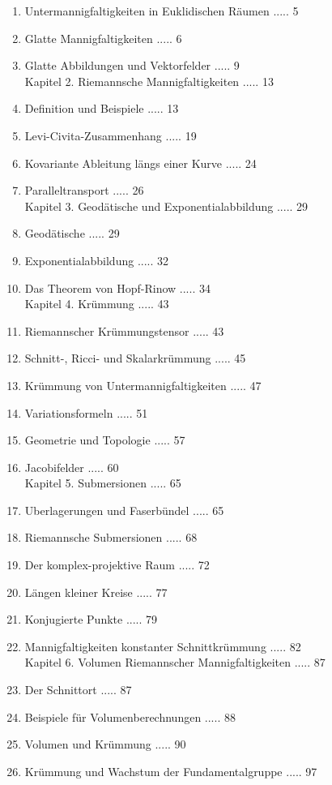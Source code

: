 \documentclass[10pt]{article}
\begin{document}
\begin{enumerate}
  \item Untermannigfaltigkeiten in Euklidischen Räumen ..... 5
  \item Glatte Mannigfaltigkeiten ..... 6
  \item Glatte Abbildungen und Vektorfelder ..... 9\\
Kapitel 2. Riemannsche Mannigfaltigkeiten ..... 13
  \item Definition und Beispiele ..... 13
  \item Levi-Civita-Zusammenhang ..... 19
  \item Kovariante Ableitung längs einer Kurve ..... 24
  \item Paralleltransport ..... 26\\
Kapitel 3. Geodätische und Exponentialabbildung ..... 29
  \item Geodätische ..... 29
  \item Exponentialabbildung ..... 32
  \item Das Theorem von Hopf-Rinow ..... 34\\
Kapitel 4. Krümmung ..... 43
  \item Riemannscher Krümmungstensor ..... 43
  \item Schnitt-, Ricci- und Skalarkrümmung ..... 45
  \item Krümmung von Untermannigfaltigkeiten ..... 47
  \item Variationsformeln ..... 51
  \item Geometrie und Topologie ..... 57
  \item Jacobifelder ..... 60\\
Kapitel 5. Submersionen ..... 65
  \item Uberlagerungen und Faserbündel ..... 65
  \item Riemannsche Submersionen ..... 68
  \item Der komplex-projektive Raum ..... 72
  \item Längen kleiner Kreise ..... 77
  \item Konjugierte Punkte ..... 79
  \item Mannigfaltigkeiten konstanter Schnittkrümmung ..... 82\\
Kapitel 6. Volumen Riemannscher Mannigfaltigkeiten ..... 87
  \item Der Schnittort ..... 87
  \item Beispiele für Volumenberechnungen ..... 88
  \item Volumen und Krümmung ..... 90
  \item Krümmung und Wachstum der Fundamentalgruppe ..... 97
\end{enumerate}
\end{document}
